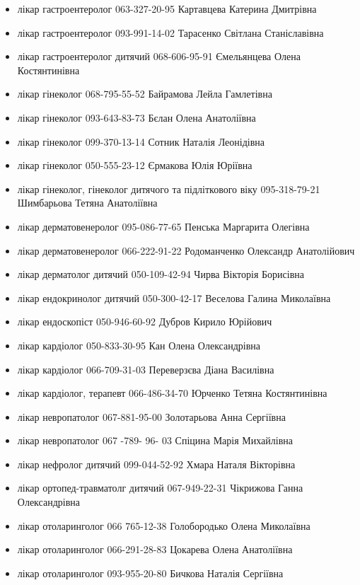 \begin{itemize}
  \item лікар гастроентеролог 063-327-20-95 Картавцева Катерина Дмитрівна 
  \item лікар гастроентеролог 093-991-14-02 Тарасенко Світлана Станіславівна
  \item лікар гастроентеролог дитячий 068-606-95-91 Ємельянцева Олена Костянтинівна 
  \item лікар гінеколог 068-795-55-52 Байрамова Лейла Гамлетівна 
  \item лікар гінеколог 093-643-83-73 Бєлан Олена Анатоліївна
  \item лікар гінеколог 099-370-13-14 Сотник Наталія Леонідівна 
  \item лікар гінеколог  050-555-23-12 Єрмакова Юлія Юріївна 
  \item лікар гінеколог, гінеколог дитячого та підліткового віку 095-318-79-21 Шимбарьова Тетяна Анатоліївна
  \item лікар дерматовенеролог 095-086-77-65 Пенська Маргарита Олегівна
  \item лікар дерматовенеролог 066-222-91-22 Родоманченко Олександр Анатолійович
  \item лікар дерматолог дитячий 050-109-42-94 Чирва Вікторія Борисівна
  \item лікар ендокринолог дитячий 050-300-42-17 Веселова Галина Миколаївна
  \item лікар ендоскопіст 050-946-60-92 Дубров Кирило Юрійович
  \item лікар кардіолог 050-833-30-95 Кан Олена Олександрівна
  \item лікар кардіолог 066-709-31-03 Переверзєва Діана Василівна 
  \item лікар кардіолог, терапевт 066-486-34-70 Юрченко Тетяна Костянтинівна 
  \item лікар невропатолог 067-881-95-00 Золотарьова Анна Сергіївна
  \item лікар невропатолог 067 -789- 96- 03 Спіцина Марія Михайлівна
  \item лікар нефролог дитячий 099-044-52-92 Хмара Наталя Вікторівна
  \item лікар ортопед-травматолг дитячий 067-949-22-31 Чікрижова Ганна Олександрівна
  \item лікар отоларинголог 066 765-12-38 Голобородько Олена Миколаївна
  \item лікар отоларинголог 066-291-28-83 Цокарева Олена Анатоліївна
  \item лікар отоларинголог 093-955-20-80 Бичкова Наталія Сергіївна

\end{itemize}
